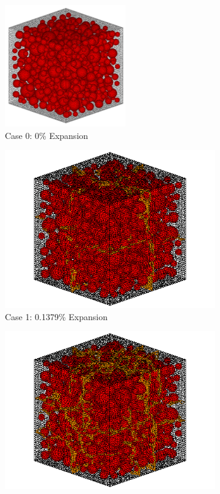 \begin{figure}[!h]
\centering

    \begin{subfigure}{.5\textwidth}
      \centering
      \includegraphics[width=.6\linewidth]{Files/exp_3D/A30Undamaged.png}
    \caption{Case 0: 0\% Expansion}
    \end{subfigure}%
    \begin{subfigure}{.5\textwidth}
      \centering
      \includegraphics[width=.8\linewidth]{Files/exp_3D/DEF/A30X0C_1_c.png}
    \caption{Case 1: 0.1379\% Expansion}
    \end{subfigure}
    \begin{subfigure}{.5\textwidth}
      \centering
      \includegraphics[width=.8\linewidth]{Files/exp_3D/DEF/A30X0C_2_c.png}

\end{subfigure}
\end{figure}
